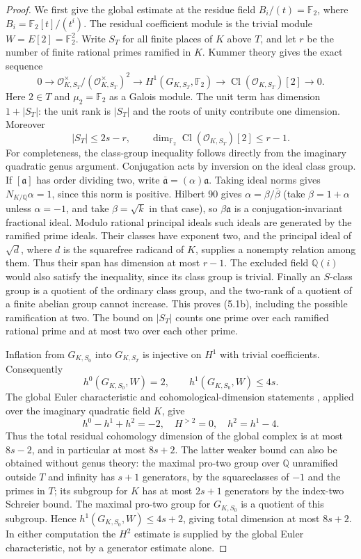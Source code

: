 \documentclass[11pt]{article}
\theoremstyle{definition}
\theoremstyle{remark}
\newcommand{\Q}{\mathbb Q}
\newcommand{\F}{\mathbb F}
\begin{document}
\begin{proof}
We first give the global estimate at the residue field
$B_i/(t)=\F_2$, where $B_i=\F_2[t]/(t^i)$. The residual coefficient
module is the trivial module $W=E[2]=\F_2^2$. Write $S_T$ for all
finite places of $K$ above $T$, and let $r$ be the number of finite
rational primes ramified in $K$. Kummer theory gives the exact sequence
\[
0\longrightarrow\mathcal O_{K,S_T}^{\times}/
                 (\mathcal O_{K,S_T}^{\times})^2
\longrightarrow H^1(G_{K,S_T},\F_2)
\longrightarrow\operatorname{Cl}(\mathcal O_{K,S_T})[2]
\longrightarrow0.
\]
Here $2\in T$ and $\mu_2=\F_2$ as a Galois module. The unit term
has dimension $1+|S_T|$: the unit rank is $|S_T|$ and the roots of
unity contribute one dimension. Moreover
\[
 |S_T|\le2s-r,\qquad
 \dim_{\F_2}\operatorname{Cl}(\mathcal O_{K,S_T})[2]\le r-1.
                                                               \tag{5.1b}
\]
For completeness, the class-group inequality follows directly from
the imaginary quadratic genus argument. Conjugation acts by inversion
on the ideal class group. If $[\mathfrak a]$ has order dividing two,
write $\overline{\mathfrak a}=(\alpha)\mathfrak a$. Taking ideal
norms gives $N_{K/\Q}\alpha=1$, since this norm is positive. Hilbert
90 gives $\alpha=\beta/\bar\beta$ (take $\beta=1+\alpha$
unless $\alpha=-1$, and take $\beta=\sqrt{k}$ in that case), so
$\beta\mathfrak a$ is a
conjugation-invariant fractional ideal. Modulo rational principal
ideals such ideals are generated by the ramified prime ideals.
Their classes have exponent two, and the principal ideal of
$\sqrt{d}$, where $d$ is the squarefree radicand of $K$, supplies
a nonempty relation among them. Thus their
span has dimension at most $r-1$. The excluded field $\Q(i)$
would also satisfy the inequality, since its class group is trivial.
Finally an $S$-class group is a quotient of the ordinary class group,
and the two-rank of a quotient of a finite abelian group cannot
increase. This proves (5.1b), including the possible ramification
at two. The bound on $|S_T|$ counts one prime over each ramified
rational prime and at most two over each other prime.

Inflation from $G_{K,S_0}$ into $G_{K,S_T}$ is injective on $H^1$
with trivial coefficients. Consequently
\[
 h^0(G_{K,S_0},W)=2,\qquad
 h^1(G_{K,S_0},W)\le4s.
\]
The global Euler characteristic and cohomological-dimension statements
\cite[I.4.10 and I.5.1]{milne}, applied over the imaginary quadratic
field $K$, give
\[
 h^0-h^1+h^2=-2,\quad H^{>2}=0,\quad
 h^2=h^1-4.
\]
Thus the total residual cohomology dimension of the global complex
is at most $8s-2$, and in particular at most $8s+2$.
The latter weaker bound can also be obtained without genus theory:
the maximal pro-two group over $\Q$ unramified outside $T$ and
infinity has $s+1$ generators, by the squareclasses of $-1$ and
the primes in $T$; its subgroup for $K$ has at most $2s+1$
generators by the index-two Schreier bound. The maximal pro-two
group for $G_{K,S_0}$ is a quotient of this subgroup. Hence
$h^1(G_{K,S_0},W)\le4s+2$, giving total dimension at most $8s+2$.
In either computation the $H^2$ estimate is supplied by the global
Euler characteristic, not by a generator estimate alone.


\end{proof}
\end{document}
